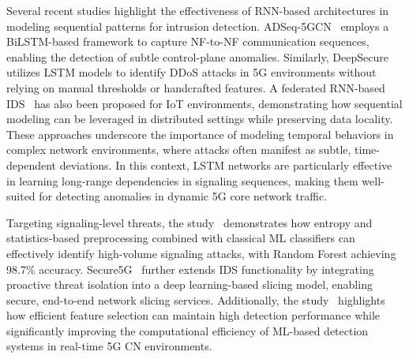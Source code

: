 \documentclass[journal,article,submit,moreauthors,pdftex]{Definitions/tsp}
\begin{document}
Several recent studies highlight the effectiveness of RNN-based architectures in modeling sequential patterns for intrusion detection. ADSeq-5GCN~\cite{tianADSeq5GCNAnomalyDetection2023} employs a BiLSTM-based framework to capture NF-to-NF communication sequences, enabling the detection of subtle control-plane anomalies. Similarly, DeepSecure~\cite{kuadeyDeepSecureDetectionDistributed2022} utilizes LSTM models to identify DDoS attacks in 5G environments without relying on manual thresholds or handcrafted features. A federated RNN-based IDS~\cite{rezaeiFederatedRNNIntrusion2025} has also been proposed for IoT environments, demonstrating how sequential modeling can be leveraged in distributed settings while preserving data locality. These approaches underscore the importance of modeling temporal behaviors in complex network environments, where attacks often manifest as subtle, time-dependent deviations. In this context, LSTM networks are particularly effective in learning long-range dependencies in signaling sequences, making them well-suited for detecting anomalies in dynamic 5G core network traffic.
 
Targeting signaling-level threats, the study~\cite{parkMachineLearningBased2022} demonstrates how entropy and statistics-based preprocessing combined with classical ML classifiers can effectively identify high-volume signaling attacks, with Random Forest achieving 98.7\% accuracy. Secure5G~\cite{thantharateSecure5GDeepLearning2020} further extends IDS functionality by integrating proactive threat isolation into a deep learning-based slicing model, enabling secure, end-to-end network slicing services. Additionally, the study~\cite{kimEffectiveFeatureSelection2022} highlights how efficient feature selection can maintain high detection performance while significantly improving the computational efficiency of ML-based detection systems in real-time 5G CN environments.
\end{document}
